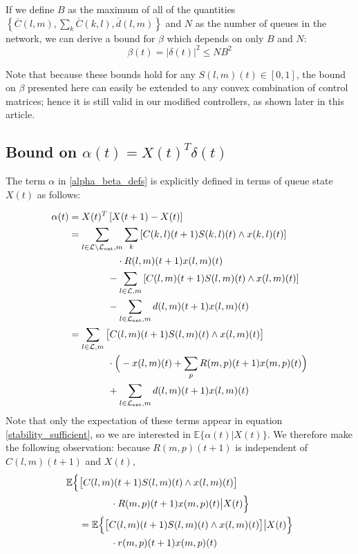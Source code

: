 If we define $B$ as the maximum of all of the quantities $\left\{ \overline{C}(l,m), \sum_{k} \overline{C}(k,l),  \overline d (l,m) \right\}$ and $N$ as the number of queues in the network, we can derive a bound for $\beta$ which depends on only $B$ and $N$: 
\begin{equation}\label{betabound}
\beta(t)  = \big| \delta(t) \big|^2 \leq NB^2 
\end{equation}

Note that because these bounds hold for any $S(l,m)(t) \in [0,1]$, the bound on $\beta$ presented here can easily be extended to 
any convex combination of control matrices; hence it is still valid in our modified controllers, as shown later in this article.

\subsection*{Bound on $\alpha (t) = X(t)^{T}\delta(t) $}
The term $\alpha$ in \eqref{alpha_beta_defs} is explicitly defined in terms of queue state $X(t)$ as follows: 

\begin{align} \nonumber 
 \alpha (t)  &=  X(t)^{T}\left[X(t+1) - X(t)\right] \\ \nonumber
 &=  \sum_{l \in \linkset \backslash \entrylinks ,m}\sum_{k}\left[ C(k,l)(t+1)S(k,l)(t)\wedge x(k,l)(t)\right]\\ \nonumber
&\qquad \qquad  \quad \cdot R(l,m)(t+1)x(l,m)(t) \\ \nonumber
&  \qquad \qquad -  \sum_{l \in \linkset,m}\left[ C(l,m)(t+1)S(l,m)(t)\wedge x(l,m)(t)\right] \\ \nonumber
&\qquad \qquad-\sum_{l \in \entrylinks ,m} d(l,m)(t+1)x(l,m)(t)\\ \nonumber
&= \sum_{l \in \linkset,m}\big[C(l,m)(t+1)S(l,m)(t)\wedge x(l,m)(t)\big] \\ \nonumber 
& \qquad \qquad \cdot \Big(-x(l,m)(t)+  \sum_{p}R(m,p)(t+1)x(m,p)(t)\Big) \\  
 & \qquad \qquad + \sum_{l \in \entrylinks,m} d(l,m)(t+1)x(l,m)(t)  
 \label{alpha_explicit}
\end{align}
Note that only the expectation of these terms appear in equation \eqref{stability_sufficient}, so we are interested in $\mathbb{E}\{\alpha(t) | X(t)\}$. We therefore make the following observation: because $R(m,p)(t+1)$ is independent of $C(l,m)(t+1)$ and $X(t)$, 
\begin{align*}
\nonumber \mathbb{E}\Big\{ &\big[C(l,m)(t+1)S(l,m)(t)\wedge x(l,m)(t)\big] \\
\nonumber & \qquad \quad  \;   \cdot R(m,p)(t+1)x(m,p)(t) \big| X(t) \Big\}  \\
\nonumber & = \mathbb{E}\Big\{ \big[C(l,m)(t+1)S(l,m)(t)\wedge x(l,m)(t)\big]  \big| X(t) \Big\} \\
\nonumber & \qquad \quad  \; \cdot r(m,p)(t+1)x(m,p)(t)
\end{align*}

